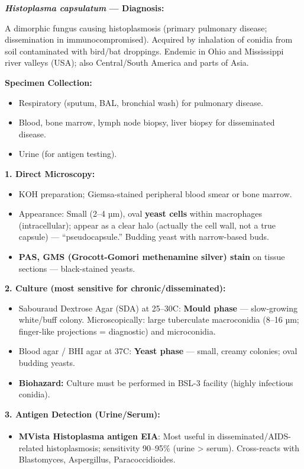 \documentclass[11pt,a4paper]{article}
\begin{document}
\begin{ansbox}
\textbf{\textit{Histoplasma capsulatum} --- Diagnosis:}

A dimorphic fungus causing histoplasmosis (primary pulmonary disease; dissemination in immunocompromised). Acquired by inhalation of conidia from soil contaminated with bird/bat droppings. Endemic in Ohio and Mississippi river valleys (USA); also Central/South America and parts of Asia.

\textbf{Specimen Collection:}
\begin{itemize}[leftmargin=*]
    \item Respiratory (sputum, BAL, bronchial wash) for pulmonary disease.
    \item Blood, bone marrow, lymph node biopsy, liver biopsy for disseminated disease.
    \item Urine (for antigen testing).
\end{itemize}

\textbf{1. Direct Microscopy:}
\begin{itemize}[leftmargin=*]
    \item KOH preparation; Giemsa-stained peripheral blood smear or bone marrow.
    \item Appearance: Small (2--4 µm), oval \textbf{yeast cells} within macrophages (intracellular); appear as a clear halo (actually the cell wall, not a true capsule) --- ``pseudocapsule.'' Budding yeast with narrow-based buds.
    \item \textbf{PAS, GMS (Grocott-Gomori methenamine silver) stain} on tissue sections --- black-stained yeasts.
\end{itemize}

\textbf{2. Culture (most sensitive for chronic/disseminated):}
\begin{itemize}[leftmargin=*]
    \item Sabouraud Dextrose Agar (SDA) at 25--30\textdegree C: \textbf{Mould phase} --- slow-growing white/buff colony. Microscopically: large tuberculate macroconidia (8--16 µm; finger-like projections = diagnostic) and microconidia.
    \item Blood agar / BHI agar at 37\textdegree C: \textbf{Yeast phase} --- small, creamy colonies; oval budding yeasts.
    \item \textbf{Biohazard:} Culture must be performed in BSL-3 facility (highly infectious conidia).
\end{itemize}

\textbf{3. Antigen Detection (Urine/Serum):}
\begin{itemize}[leftmargin=*]
    \item \textbf{MVista\textsuperscript{\textregistered} Histoplasma antigen EIA}: Most useful in disseminated/AIDS-related histoplasmosis; sensitivity 90--95\% (urine \textgreater{} serum). Cross-reacts with Blastomyces, Aspergillus, Paracoccidioides.
\end{itemize}


\end{ansbox}
\end{document}
